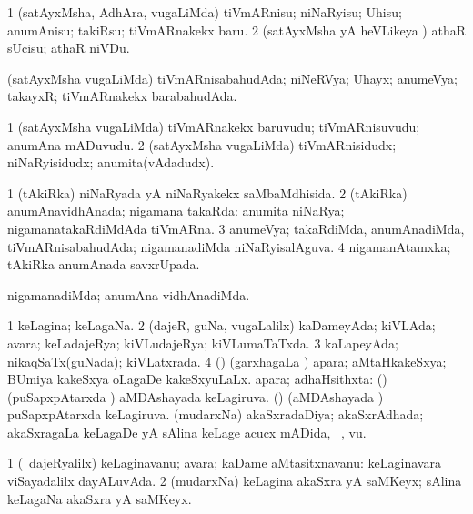 \bentry
{}
\gl{\sakirx}
\bmng
\bnum
\num{1} (satAyxMsha, AdhAra, \mo vugaLiMda) tiVmARnisu; niNaRyisu; Uhisu; anumAnisu; takiRsu; tiVmARnakekx baru. 
\num{2} (satAyxMsha yA heVLikeya \vi) athaR sUcisu; athaR niVDu. 
\enum
\emng
\eentry

\bentry
{}
\gl{\gu}
\bmng
(satAyxMsha \mo vugaLiMda) tiVmARnisabahudAda; niNeRVya; Uhayx; anumeVya; takayxR; tiVmARnakekx barabahudAda. 
\emng
\eentry

\bentry
{}
\gl{\nA}
\bmng
\bnum
\num{1} (satAyxMsha \mo vugaLiMda) tiVmARnakekx baruvudu; tiVmARnisuvudu; anumAna mADuvudu. 
\num{2} (satAyxMsha \mo vugaLiMda) tiVmARnisidudx; niNaRyisidudx; anumita(vAdadudx). 
\enum
\emng
\eentry

\bentry
{}
\gl{\gu}
\bmng
\bnum
\num{1} (tAkiRka) niNaRyada yA niNaRyakekx saMbaMdhisida. 
\num{2} (tAkiRka) anumAnavidhAnada; nigamana takaRda:  anumita niNaRya; nigamanatakaRdiMdAda tiVmARna. 
\num{3} anumeVya; takaRdiMda, anumAnadiMda, tiVmARnisabahudAda; nigamanadiMda niNaRyisalAguva. 
\num{4} nigamanAtamxka; tAkiRka anumAnada savxrUpada. 
\enum
\emng
\eentry

\bentry
{}
\gl{\kirxvi}
\bmng
nigamanadiMda; anumAna vidhAnadiMda. 
\emng
\eentry

\bentry
{}
\gl{\gu}
\bmng
\bnum
\num{1} keLagina; keLagaNa. 
\num{2} (dajeR, guNa, \mo vugaLalilx) kaDameyAda; kiVLAda; avara; keLadajeRya; kiVLudajeRya; kiVLumaTaTxda. 
\num{3} kaLapeyAda; nikaqSaTx(guNada); kiVLatxrada. 
\num{4} (\Kavi) (garxhagaLa \vi) apara; aMtaHkakeSxya; BUmiya kakeSxya oLagaDe kakeSxyuLaLx. 
 apara; adhaHsithxta: 
\banum
{} (\savi) (puSapxpAtarxda \vi) aMDAshayada keLagiruva. 
 (\savi) (aMDAshayada \vi) puSapxpAtarxda keLagiruva. 
 (mudarxNa) akaSxradaDiya; akaSxrAdhada; akaSxragaLa keLagaDe yA sAlina keLage acucx mADida, \udA\ , \mo vu. 
\eanum
\numie
\enum
\emng
\eentry

\bentry
{}
\gl{\nA}
\bmng
\bnum
\num{1} (\kanmu\ dajeRyalilx) keLaginavanu; avara; kaDame aMtasitxnavanu:  keLaginavara viSayadalilx dayALuvAda. 
\num{2} (mudarxNa) keLagina akaSxra yA saMKeyx; sAlina keLagaNa akaSxra yA saMKeyx. 
\enum
\emng
\eentry

